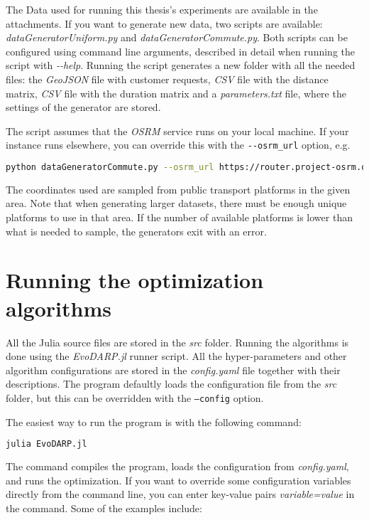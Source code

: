 The Data used for running this thesis's experiments are available in the attachments. If you want to generate new data, two scripts are available: \textit{dataGeneratorUniform.py} and \textit{dataGeneratorCommute.py}. Both scripts can be configured using command line arguments, described in detail when running the script with \textit{-{}-help}. Running the script generates a new folder with all the needed files: the \textit{GeoJSON} file with customer requests, \textit{CSV} file with the distance matrix, \textit{CSV} file with the duration matrix and a \textit{parameters.txt} file, where the settings of the generator are stored.

The script assumes that the \textit{OSRM} service runs on your local machine. If your instance runs elsewhere, you can override this with the \texttt{-{}-osrm\_url} option, e.g.

\begin{lstlisting}[language=bash, breaklines=true]
    python dataGeneratorCommute.py --osrm_url https://router.project-osrm.org
\end{lstlisting}

The coordinates used are sampled from public transport platforms in the given area. Note that when generating larger datasets, there must be enough unique platforms to use in that area. If the number of available platforms is lower than what is needed to sample, the generators exit with an error.

\section{Running the optimization algorithms}

All the Julia source files are stored in the \textit{src} folder. Running the algorithms is done using the \textit{EvoDARP.jl} runner script. All the hyper-parameters and other algorithm configurations are stored in the \textit{config.yaml} file together with their descriptions. The program defaultly loads the configuration file from the \textit{src} folder, but this can be overridden with the \texttt{--config} option.

The easiest way to run the program is with the following command:
\begin{lstlisting}[language=bash]
    julia EvoDARP.jl
\end{lstlisting}

The command compiles the program, loads the configuration from \textit{config.yaml}, and runs the optimization. If you want to override some configuration variables directly from the command line, you can enter key-value pairs \textit{variable=value} in the command. Some of the examples include:

